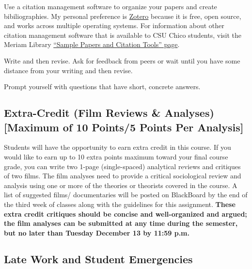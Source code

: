 \documentclass[11pt,]{article}
\begin{document}
Use a citation management software to organize your papers and create
bibiliographies. My personal preference is
\href{https://www.zotero.org/}{Zotero} because it is free, open source,
and works across multiple operating systems. For information about other
citation management software that is available to CSU Chico students,
visit the Meriam Library
\href{https://libguides.csuchico.edu/c.php?g=432300\&p=2948649}{``Sample
Papers and Citation Tools'' page}.

Write and then revise. Ask for feedback from peers or wait until you
have some distance from your writing and then revise.

Prompt yourself with questions that have short, concrete answers.

\hypertarget{extra-credit-film-reviews-analyses-maximum-of-10-points5-points-per-analysis}{%
\subsection{Extra-Credit (Film Reviews \& Analyses) {[}Maximum of 10
Points/5 Points Per
Analysis{]}}\label{extra-credit-film-reviews-analyses-maximum-of-10-points5-points-per-analysis}}

Students will have the opportunity to earn extra credit in this course.
If you would like to earn up to 10 extra points maximum toward your
final course grade, you can write two 1-page (single-spaced) analytical
reviews and critiques of two films. The film analyses need to provide a
critical sociological review and analysis using one or more of the
theories or theorists covered in the course. A list of suggested films/
documentaries will be posted on BlackBoard by the end of the third week
of classes along with the guidelines for this assignment. \textbf{These
extra credit critiques should be concise and well-organized and argued;
the film analyses can be submitted at any time during the semester, but
no later than Tuesday December 13 by 11:59 p.m.}

\hypertarget{late-work-and-student-emergencies}{%
\subsection{Late Work and Student
Emergencies}\label{late-work-and-student-emergencies}}
\end{document}
